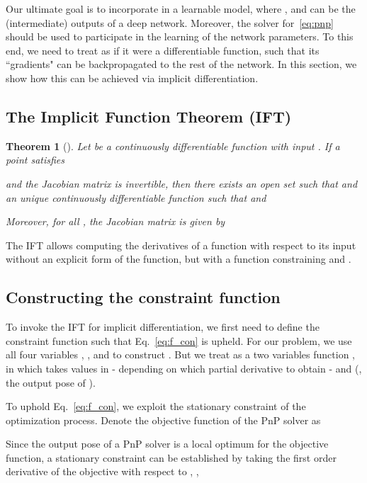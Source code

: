 \documentclass[10pt,twocolumn,letterpaper]{article}
\newtheorem{tm}{Theorem}
\begin{document}
Our ultimate goal is to incorporate  in a learnable model, where ,  and  can be the (intermediate) outputs of a deep network. Moreover, the solver for~\eqref{eq:pnp} should be used to participate in the learning of the network parameters. To this end, we need to treat  as if it were a differentiable function, such that its ``gradients" can be backpropagated to the rest of the network. In this section, we show how this can be achieved via implicit differentiation.

\subsection{The Implicit Function Theorem (IFT)}
 
\begin{tm}[\cite{Krantz2012implicit}]\label{tm:ift}
Let  be a continuously differentiable function with input . If a point  satisfies

and the Jacobian matrix  is invertible, then there exists an open set  such that  and an unique continuously differentiable function  such that  and 


Moreover, for all , the Jacobian matrix  is given by
  
\end{tm}

The IFT allows computing the derivatives of a function  with respect to its input  without an explicit form of the function, but with a function  constraining  and . 



\subsection{Constructing the constraint function }\label{sec:f}



To invoke the IFT for implicit differentiation, we first need to define the constraint function  such that Eq.~\eqref{eq:f_con} is upheld. For our problem, we use all four variables , ,  and  to construct . But we treat  as a two variables function , in which  takes values in   - depending on which partial derivative to obtain - and   (\ie, the output pose of ).

To uphold Eq.~\eqref{eq:f_con}, we exploit the stationary constraint of the optimization process. Denote the objective function of the PnP solver  as

Since the output pose  of a PnP solver is a local optimum for the objective function, a stationary constraint can be established by taking the first order derivative of the objective with respect to , \ie,
\end{document}
